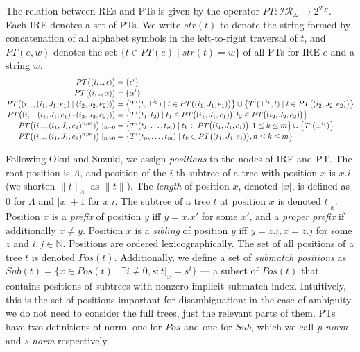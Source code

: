 \documentclass[AMA,STIX1COL]{WileyNJD-v2}
\newcommand{\Xund}{\rule{.4em}{.4pt}}
\newcommand{\XI}{\mathcal{I}}
\newcommand{\XIR}{\XI\!\XR}
\newcommand{\XR}{\mathcal{R}}
\newcommand{\XT}{\mathcal{T}}
\newcommand{\YN}{\mathbb{N}}
\newcommand{\PT}{PT}
\begin{document}
The relation between REs and PTs is given by the operator $\PT : \XIR_\Sigma \rightarrow 2^{\XT_\Sigma}$.
Each IRE denotes a set of PTs.
%
We write $str(t)$ to denote the string formed by concatenation of all alphabet symbols in the left-to-right traversal of $t$,
and $\PT(e, w)$ denotes the set $\big\{ t \in \PT(e) \mid str(t) = w \big\}$ of all PTs for IRE $e$ and a string $w$.
%
    \begin{align*}
        \PT\big((i, \Xund, \epsilon)\big) &= \{ {\epsilon}^{i} \}
        \\[-0.2em]
        \PT\big((i, \Xund, \alpha)\big) &= \{ {\alpha}^{i} \}
        \\[-0.2em]
        \PT\big((i, \Xund, (i_1, J_1, e_1) \mid (i_2, J_2, e_2))\big) &=
            \big\{ {T}^{i}(t, \bot^{i_2}) \mid t \in \PT\big((i_1, J_1, e_1)\big) \big\} \cup
            \big\{ {T}^{i}(\bot^{i_1}, t) \mid t \in \PT\big((i_2, J_2, e_2)\big) \big\}
        \\[-0.2em]
        \PT\big((i, \Xund, (i_1, J_1, e_1) \cdot (i_2, J_2, e_2))\big) &=
            \big\{ {T}^{i}(t_1, t_2) \mid
                t_1 \in \PT\big((i_1, J_1, e_1)\big),
                t_2 \in \PT\big((i_2, J_2, e_2)\big)
            \big\}
        \\[-0.2em]
        \PT\big((i, \Xund, (i_1, J_1, e_1)^{n, m})\big) \mid_{n = 0} &=
            \big\{ {T}^{i}(t_1, \dots, t_m) \mid t_k \in \PT\big((i_1, J_1, e_1)\big), 1 \leq k \leq m \big\}
                \cup \big\{ {T}^{i}(\bot^{i_1}) \big\}
        \\[-0.2em]
        \PT\big((i, \Xund, (i_1, J_1, e_1)^{n, m})\big) \mid_{n > 0} &=
            \big\{ {T}^{i}(t_n, \dots, t_m) \mid t_k \in \PT\big((i_1, J_1, e_1)\big), n \leq k \leq m \big\}
    \end{align*}

Following Okui and Suzuki, we assign \emph{positions} to the nodes of IRE and PT.
The root position is $\Lambda$, and position of the $i$-th subtree of a tree with position $x$ is $x.i$
(we shorten $\|t\|_\Lambda$ as $\|t\|$).
The \emph{length} of position $x$, denoted $|x|$, is defined as $0$ for $\Lambda$ and $|x| + 1$ for $x.i$.
The subtree of a tree $t$ at position $x$ is denoted $t|_x$.
Position $x$ is a \emph{prefix} of position $y$ iff $y = x.x'$ for some $x'$,
and a \emph{proper prefix} if additionally $x \neq y$.
Position $x$ is a \emph{sibling} of position $y$ iff $y = z.i, x = z.j$ for some $z$ and $i,j \in \YN$.
Positions are ordered lexicographically.
The set of all positions of a tree $t$ is denoted $Pos(t)$.
Additionally, we define a set of \emph{submatch positions} as
$Sub(t) = \big\{ x \in Pos(t) \mid \exists i \neq 0, s: t|_x = s^i\big\}$ ---
a subset of $Pos(t)$ that contains positions of subtrees with nonzero implicit submatch index.
Intuitively, this is the set of positions important for disambiguation:
in the case of ambiguity we do not need to consider the full trees,
just the relevant parts of them.
%
PTs have two definitions of norm, one for $Pos$ and one for $Sub$,
which we call \emph{p-norm} and \emph{s-norm} respectively.
\end{document}
